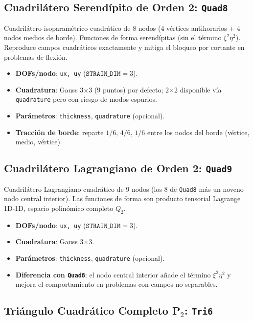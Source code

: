 \documentclass[11pt,oneside]{report}
\begin{document}
\subsection{Cuadrilátero Serendípito de Orden 2: \texttt{Quad8}}

Cuadrilátero isoparamétrico cuadrático de 8 nodos (4 vértices antihorarios + 4 nodos medios de borde). Funciones de forma serendípitas (sin el término $\xi^2\eta^2$). Reproduce campos cuadráticos exactamente y mitiga el bloqueo por cortante en problemas de flexión.

\begin{itemize}
  \item \textbf{DOFs/nodo}: \texttt{ux, uy} ($\texttt{STRAIN\_DIM} = 3$).
  \item \textbf{Cuadratura}: Gauss 3\ensuremath{\times}3 (9 puntos) por defecto; 2\ensuremath{\times}2 disponible vía \texttt{quadrature} pero con riesgo de modos espurios.
  \item \textbf{Parámetros}: \texttt{thickness}, \texttt{quadrature} (opcional).
  \item \textbf{Tracción de borde}: reparte $1/6$, $4/6$, $1/6$ entre los nodos del borde (vértice, medio, vértice).
\end{itemize}

\subsection{Cuadrilátero Lagrangiano de Orden 2: \texttt{Quad9}}

Cuadrilátero Lagrangiano cuadrático de 9 nodos (los 8 de \texttt{Quad8} más un noveno nodo central interior). Las funciones de forma son producto tensorial Lagrange 1D-1D, espacio polinómico completo $Q_2$.

\begin{itemize}
  \item \textbf{DOFs/nodo}: \texttt{ux, uy} ($\texttt{STRAIN\_DIM} = 3$).
  \item \textbf{Cuadratura}: Gauss 3\ensuremath{\times}3.
  \item \textbf{Parámetros}: \texttt{thickness}, \texttt{quadrature} (opcional).
  \item \textbf{Diferencia con \texttt{Quad8}}: el nodo central interior añade el término $\xi^2\eta^2$ y mejora el comportamiento en problemas con campos no separables.
\end{itemize}

\subsection{Triángulo Cuadrático Completo P\ensuremath{_{2}}: \texttt{Tri6}}
\end{document}
